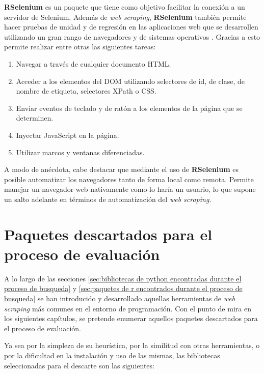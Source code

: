 \textbf{RSelenium} \cite{rselenium-cran} es un paquete que tiene como objetivo facilitar la conexión a un 
servidor de Selenium. Además de \emph{web scraping}, \textbf{RSelenium} también permite hacer pruebas de 
unidad y de regresión en las aplicaciones web que se desarrollen utilizando un gran rango de navegadores 
y de sistemas operativos \cite{tfg-daniel-francisco-lopez}. Gracias a esto permite realizar entre otras 
las siguientes tareas:

\begin{enumerate}
  \item Navegar a través de cualquier documento HTML.
  \item Acceder a los elementos del DOM utilizando selectores de id, de clase, de nombre de etiqueta, 
  selectores XPath o CSS.
  \item Enviar eventos de teclado y de ratón a los elementos de la página que se determinen.
  \item Inyectar JavaScript en la página.
  \item Utilizar marcos y ventanas diferenciadas.
\end{enumerate}

A modo de anécdota, cabe destacar que mediante el uso de \textbf{RSelenium} es posible automatizar los
navegadores tanto de forma local como remota. Permite manejar un navegador web nativamente como lo haría
un usuario, lo que supone un salto adelante en términos de automatización del \emph{web scraping}.

\section{Paquetes descartados para el proceso de evaluación}
\label{sec:paquetes descartados para el proceso de evaluacion}

A lo largo de las secciones \ref{sec:bibliotecas de python encontradas durante el proceso de busqueda} y
\ref{sec:paquetes de r encontrados durante el proceso de busqueda} se han introducido y desarrollado
aquellas herramientas de \emph{web scraping} más comunes en el entorno de programación. Con el punto de 
mira en los siguientes capítulos, se pretende enumerar aquellos paquetes descartados para el proceso de 
evaluación.

Ya sea por la simpleza de su heurística, por la similitud con otras herramientas, o por la dificultad en 
la instalación y uso de las mismas, las bibliotecas seleccionadas para el descarte son las siguientes:

